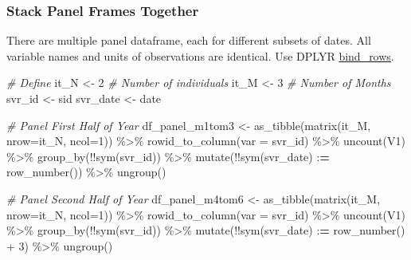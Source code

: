 \documentclass[
]{book}
\newenvironment{Shaded}{\begin{snugshade}}{\end{snugshade}}
\newcommand{\AttributeTok}[1]{\textcolor[rgb]{0.77,0.63,0.00}{#1}}
\newcommand{\CommentTok}[1]{\textcolor[rgb]{0.56,0.35,0.01}{\textit{#1}}}
\newcommand{\DecValTok}[1]{\textcolor[rgb]{0.00,0.00,0.81}{#1}}
\newcommand{\ErrorTok}[1]{\textcolor[rgb]{0.64,0.00,0.00}{\textbf{#1}}}
\newcommand{\FunctionTok}[1]{\textcolor[rgb]{0.00,0.00,0.00}{#1}}
\newcommand{\NormalTok}[1]{#1}
\newcommand{\OtherTok}[1]{\textcolor[rgb]{0.56,0.35,0.01}{#1}}
\newcommand{\SpecialCharTok}[1]{\textcolor[rgb]{0.00,0.00,0.00}{#1}}
\newcommand{\StringTok}[1]{\textcolor[rgb]{0.31,0.60,0.02}{#1}}
\begin{document}
\hypertarget{stack-panel-frames-together}{%
\subsubsection{Stack Panel Frames Together}\label{stack-panel-frames-together}}

There are multiple panel dataframe, each for different subsets of dates. All variable names and units of observations are identical. Use DPLYR \href{https://dplyr.tidyverse.org/reference/bind.html}{bind\_rows}.

\begin{Shaded}
\begin{Highlighting}[]
\CommentTok{\# Define}
\NormalTok{it\_N }\OtherTok{\textless{}{-}} \DecValTok{2} \CommentTok{\# Number of individuals}
\NormalTok{it\_M }\OtherTok{\textless{}{-}} \DecValTok{3} \CommentTok{\# Number of Months}
\NormalTok{svr\_id }\OtherTok{\textless{}{-}} \StringTok{\textquotesingle{}sid\textquotesingle{}}
\NormalTok{svr\_date }\OtherTok{\textless{}{-}} \StringTok{\textquotesingle{}date\textquotesingle{}}

\CommentTok{\# Panel First Half of Year}
\NormalTok{df\_panel\_m1tom3 }\OtherTok{\textless{}{-}} \FunctionTok{as\_tibble}\NormalTok{(}\FunctionTok{matrix}\NormalTok{(it\_M, }\AttributeTok{nrow=}\NormalTok{it\_N, }\AttributeTok{ncol=}\DecValTok{1}\NormalTok{)) }\SpecialCharTok{\%\textgreater{}\%}
  \FunctionTok{rowid\_to\_column}\NormalTok{(}\AttributeTok{var =}\NormalTok{ svr\_id) }\SpecialCharTok{\%\textgreater{}\%}
  \FunctionTok{uncount}\NormalTok{(V1) }\SpecialCharTok{\%\textgreater{}\%}
  \FunctionTok{group\_by}\NormalTok{(}\SpecialCharTok{!!}\FunctionTok{sym}\NormalTok{(svr\_id)) }\SpecialCharTok{\%\textgreater{}\%} \FunctionTok{mutate}\NormalTok{(}\SpecialCharTok{!!}\FunctionTok{sym}\NormalTok{(svr\_date) }\SpecialCharTok{:}\ErrorTok{=} \FunctionTok{row\_number}\NormalTok{()) }\SpecialCharTok{\%\textgreater{}\%}
  \FunctionTok{ungroup}\NormalTok{()}

\CommentTok{\# Panel Second Half of Year}
\NormalTok{df\_panel\_m4tom6 }\OtherTok{\textless{}{-}} \FunctionTok{as\_tibble}\NormalTok{(}\FunctionTok{matrix}\NormalTok{(it\_M, }\AttributeTok{nrow=}\NormalTok{it\_N, }\AttributeTok{ncol=}\DecValTok{1}\NormalTok{)) }\SpecialCharTok{\%\textgreater{}\%}
  \FunctionTok{rowid\_to\_column}\NormalTok{(}\AttributeTok{var =}\NormalTok{ svr\_id) }\SpecialCharTok{\%\textgreater{}\%}
  \FunctionTok{uncount}\NormalTok{(V1) }\SpecialCharTok{\%\textgreater{}\%}
  \FunctionTok{group\_by}\NormalTok{(}\SpecialCharTok{!!}\FunctionTok{sym}\NormalTok{(svr\_id)) }\SpecialCharTok{\%\textgreater{}\%} \FunctionTok{mutate}\NormalTok{(}\SpecialCharTok{!!}\FunctionTok{sym}\NormalTok{(svr\_date) }\SpecialCharTok{:}\ErrorTok{=} \FunctionTok{row\_number}\NormalTok{() }\SpecialCharTok{+} \DecValTok{3}\NormalTok{) }\SpecialCharTok{\%\textgreater{}\%}
  \FunctionTok{ungroup}\NormalTok{()}


\end{Highlighting}
\end{Shaded}
\end{document}
